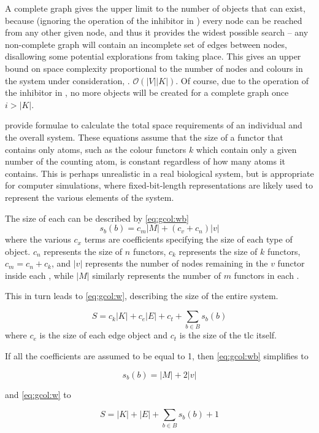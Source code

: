 A complete graph gives the upper limit to the number of objects that can exist, because (ignoring the operation of the \gls{inhibitor} in ) every node can be reached from any other given node, and thus it provides the widest possible search -- any non-complete graph will contain an incomplete set of edges between nodes, disallowing some potential explorations from taking place.  This gives an upper bound on space complexity proportional to the number of nodes and colours in the system under consideration, \ie{}. \(\mathcal{O}(|V||K|)\).  Of course, due to the operation of the \gls{inhibitor} in , no more \bo{} objects will be created for a complete graph once \(i > |K|\).

 provide formulae to calculate the total space requirements of an individual \bo{} and the overall system. These equations assume that the size of a functor that contains only atoms, such as the colour functors \(k\) which contain only a given number of the counting atom, is constant regardless of how many atoms it contains.  This is perhaps unrealistic in a real biological system, but is appropriate for computer simulations, where fixed-bit-length representations are likely used to represent the various elements of the system.

The size of each \bo{} can be described by \cref{eq:gcol:wb}
\begin{equation}\label{eq:gcol:wb}
    s_b(b) = c_m |M| + (c_v + c_n) |v|
\end{equation} where the various \(c_x\) terms are coefficients specifying the size of each type of object.  \(c_n\) represents the size of \(n\) functors, \(c_k\) represents the size of \(k\) functors, \(c_m = c_n + c_k\), and \(|v|\) represents the number of nodes remaining in the \(v\) functor inside each \bo{}, while \(|M|\) similarly represents the number of \(m\) functors in each \bo{}.

This in turn leads to \cref{eq:gcol:w}, describing the size of the entire system.

\begin{equation}\label{eq:gcol:w}
    S = c_k |K| + c_e |E| + c_t + \sum_{b \in B}s_b(b)
\end{equation} where \(c_e\) is the size of each edge object and \(c_t\) is the size of the \gls{tlc} itself.

If all the coefficients are assumed to be equal to 1, then \cref{eq:gcol:wb} simplifies to 

\begin{equation}
    s_b(b) = |M| + 2 |v|
\end{equation}

and \cref{eq:gcol:w} to

\begin{equation}
    S = |K| + |E| + \sum_{b \in B}s_b(b) + 1
\end{equation}
